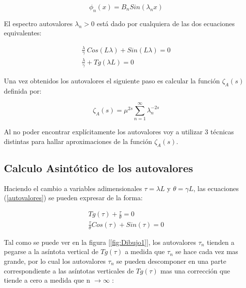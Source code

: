 \begin{equation}
\phi _n (x) = 
B _n Sin( \lambda _n x )
\end{equation}

El espectro autovalores $\lambda _n > 0 $ está dado por  cualquiera de las dos ecuaciones equivalentes: 

\begin{equation}
\begin{array}{cc}
    \frac{\lambda}{\gamma}  \ Cos( L \lambda ) +   Sin( L \lambda ) = 0 \\[5pt]
    \frac{\lambda}{\gamma}  + Tg(\lambda L )  = 0 
\label{autovalores}
\end{array}
\end{equation}



Una vez obtenidos los autovalores el siguiente paso es calcular la función $\zeta _A (s) $ definida por:

\begin{equation}
    \zeta _ {A } (s) = \mu ^{2s} \sum_{n = 1} ^{ \infty } \lambda _n ^ {-2 s}
\end{equation}

Al no poder encontrar explícitamente los autovalores voy a utilizar 3 técnicas distintas para hallar aproximaciones de la función $\zeta _A (s)$.

\subsection{Calculo Asintótico de los autovalores}


Haciendo el cambio a variables adimensionales $\tau = \lambda L $ y $\theta = \gamma L $, las ecuaciones (\ref{autovalores}) se pueden expresar de la forma:

\begin{equation}
\begin{array}{c}
    Tg(\tau) + \frac{\tau}{\theta} = 0 \\[5pt]
    \frac{\tau}{\theta} Cos( \tau ) + Sin( \tau ) = 0
\end{array}
\label{eq.asintota}
\end{equation}

Tal como se puede ver en la figura [\ref{fig:Dibujo1}], los autovalores $\tau _n$ tienden a pegarse a la asíntota vertical de $ Tg ( \tau ) $ a medida que $\tau _n$ se hace cada vez mas grande, por lo cual los autovalores $\tau _n$ se pueden descomponer en una parte correspondiente a las asíntotas verticales de $Tg( \tau )$ mas una corrección que tiende a cero a medida que n  $ \rightarrow \infty$ :

